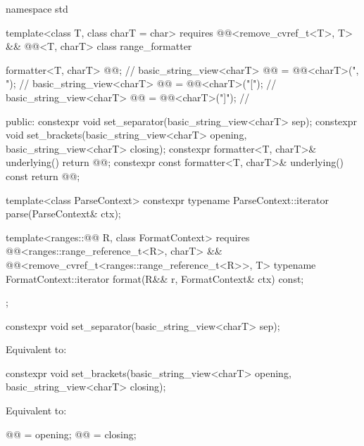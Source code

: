 %
\begin{codeblock}
namespace std {
  template<class T, class charT = char>
    requires @@<remove_cvref_t<T>, T> && @@<T, charT>
  class range_formatter {
    formatter<T, charT> @@;                                          // \expos
    basic_string_view<charT> @@ = @@<charT>(", ");      // \expos
    basic_string_view<charT> @@ = @@<charT>("["); // \expos
    basic_string_view<charT> @@ = @@<charT>("]"); // \expos

  public:
    constexpr void set_separator(basic_string_view<charT> sep);
    constexpr void set_brackets(basic_string_view<charT> opening,
                                basic_string_view<charT> closing);
    constexpr formatter<T, charT>& underlying() { return @@; }
    constexpr const formatter<T, charT>& underlying() const { return @@; }

    template<class ParseContext>
      constexpr typename ParseContext::iterator
        parse(ParseContext& ctx);

    template<ranges::@@ R, class FormatContext>
        requires @@<ranges::range_reference_t<R>, charT> &&
                 @@<remove_cvref_t<ranges::range_reference_t<R>>, T>
      typename FormatContext::iterator
        format(R&& r, FormatContext& ctx) const;
  };
}
\end{codeblock}

%
\begin{itemdecl}
constexpr void set_separator(basic_string_view<charT> sep);
\end{itemdecl}

\begin{itemdescr}
\pnum
\effects
Equivalent to: 
\end{itemdescr}

%
\begin{itemdecl}
constexpr void set_brackets(basic_string_view<charT> opening, basic_string_view<charT> closing);
\end{itemdecl}

\begin{itemdescr}
\pnum
\effects
Equivalent to:
\begin{codeblock}
@@ = opening;
@@ = closing;
\end{codeblock}
\end{itemdescr}

